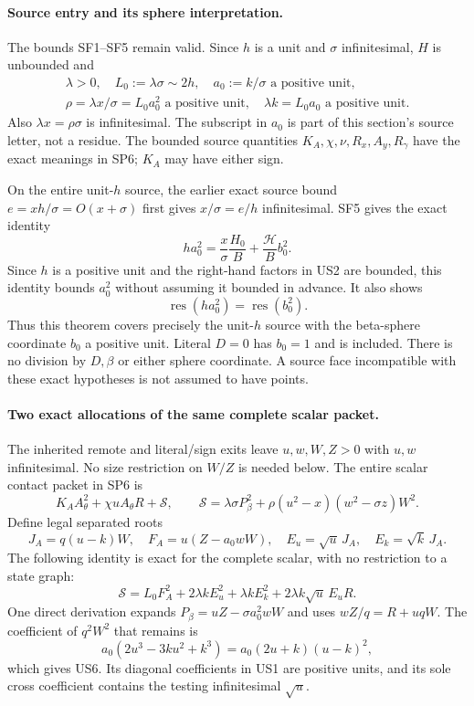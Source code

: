 \paragraph{Source entry and its sphere interpretation.}
The bounds SF1--SF5 remain valid. Since $h$ is a unit and
$\sigma$ infinitesimal, $H$ is unbounded and
\[
 \begin{gathered}
 \lambda>0,\quad L_0:=\lambda\sigma\sim2h,\quad
 a_0:=k/\sigma\text{ a positive unit},\\
 \rho=\lambda x/\sigma=L_0a_0^2\text{ a positive unit},
 \quad \lambda k=L_0a_0\text{ a positive unit}.
 \end{gathered}
 \tag{US1}
\]
Also $\lambda x=\rho\sigma$ is infinitesimal. The subscript in
$a_0$ is part of this section's source letter, not a residue.
The bounded source quantities $K_A,\chi,\nu,R_x,A_y,R_\gamma$
have the exact meanings in SP6; $K_A$ may have either sign.

On the entire unit-$h$ source, the earlier exact source bound
$e=xh/\sigma=O(x+\sigma)$ first gives $x/\sigma=e/h$
infinitesimal. SF5 gives the exact identity
\[
 h a_0^2=\frac{x}{\sigma}\frac{H_0}{B}
                    +\frac{\mathcal H}{B}b_0^2.
 \tag{US2}
\]
Since $h$ is a positive unit and the right-hand factors in US2 are
bounded, this identity bounds $a_0^2$ without assuming it bounded
in advance. It also shows
\[
        \operatorname{res}(h a_0^2)=\operatorname{res}(b_0^2).
 \tag{US3}
\]
Thus this theorem covers precisely the unit-$h$ source with the
beta-sphere coordinate $b_0$ a positive unit. Literal $D=0$ has
$b_0=1$ and is included. There is no division by $D,\beta$ or
either sphere coordinate. A source face incompatible with these
exact hypotheses is not assumed to have points.

\paragraph{Two exact allocations of the same complete scalar packet.}
The inherited remote and literal/sign exits leave $u,w,W,Z>0$ with
$u,w$ infinitesimal. No size restriction on $W/Z$ is needed below.
The entire scalar contact packet in SP6 is
\[
 K_AA_\theta^2+\chi uA_\theta R+\mathscr S,
 \qquad
 \mathscr S=\lambda\sigma P_\beta^2
       +\rho(u^2-x)(w^2-\sigma z)W^2.
 \tag{US4}
\]
Define legal separated roots
\[
 J_A=q(u-k)W,\quad
 F_A=u(Z-a_0wW),\quad
 E_u=\sqrt u\,J_A,\quad E_k=\sqrt k\,J_A.
 \tag{US5}
\]
The following identity is exact for the complete scalar, with no
restriction to a state graph:
\[
 \boxed{\mathscr S=L_0F_A^2
       +2\lambda k E_u^2+\lambda k E_k^2
       +2\lambda k\sqrt u\,E_uR.}
 \tag{US6}
\]
One direct derivation expands $P_\beta=uZ-\sigma a_0^2wW$ and
uses $wZ/q=R+uqW$. The coefficient of $q^2W^2$ that remains is
\[
 a_0(2u^3-3ku^2+k^3)=a_0(2u+k)(u-k)^2,
\]
which gives US6. Its diagonal coefficients in US1 are positive
units, and its sole cross coefficient contains the testing
infinitesimal $\sqrt u$.

